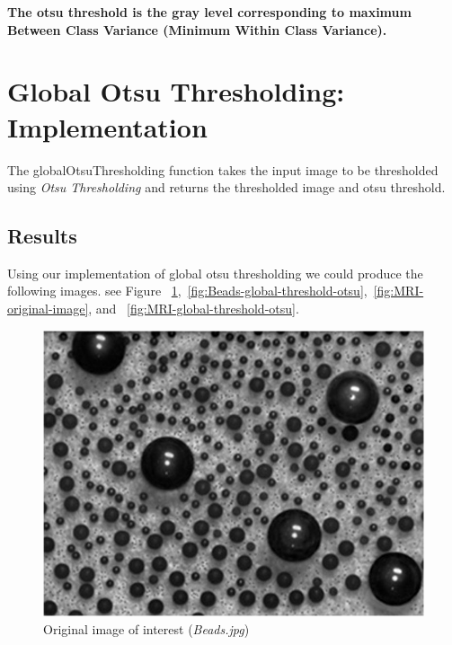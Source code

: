\documentclass[letterpaper, 12 pt, conference ,onecolumn]{ieeeconf}  %
\begin{document}
\textbf{The otsu threshold is the gray level corresponding to maximum Between Class Variance 		(Minimum Within Class Variance).}

\section*{Global Otsu Thresholding: Implementation}
The globalOtsuThresholding function takes the input image to be thresholded using \textit{Otsu Thresholding} and returns the thresholded image and otsu threshold.


\subsection*{\textbf{Results}}
Using our implementation of global otsu thresholding we could produce the following images. see Figure ~\ref{fig:Beads-original-image},~\ref{fig:Beads-global-threshold-otsu},~\ref{fig:MRI-original-image}, and ~\ref{fig:MRI-global-threshold-otsu}.


\begin{figure}[h!]
\centering
\includegraphics[width=0.4\paperwidth]{otsu-thresholding/global/Beads.jpg}
\caption{Original image of interest (\textit{Beads.jpg}) }
\label{fig:Beads-original-image}
\end{figure}
\end{document}
